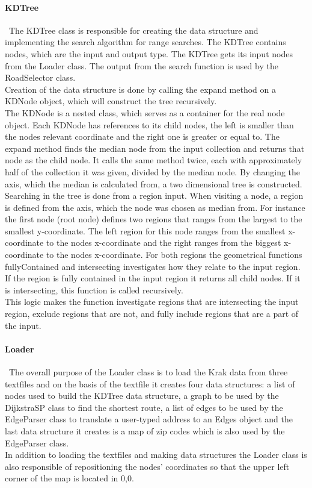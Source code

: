 \documentclass[a4paper,10pt,titlepage]{article}
\begin{document}
				\paragraph{KDTree}\mbox{}\
				The KDTree class is responsible for creating the data structure and implementing the search algorithm for range searches. The KDTree contains nodes, which are the input and output type. The KDTree gets its input nodes from the Loader class. The output from the search function is used by the RoadSelector class.\\
Creation of the data structure is done by calling the expand method on a KDNode object, which will construct the tree recursively.\\The KDNode is a nested class, which serves as a container for the real node object. Each KDNode has references to its child nodes, the left is smaller than the nodes relevant coordinate and the right one is greater or equal to. The expand method finds the median node from the input collection and returns that node as the child node. It calls the same method twice, each with approximately half of the collection it was given, divided by the median node. By changing the axis, which the median is calculated from, a two dimensional tree is constructed.\\
Searching in the tree is done from a region input. When visiting a node, a region is defined from the axis, which the node was chosen as median from. For instance the first node (root node) defines two regions that ranges from the largest to the smallest y-coordinate. The left region for this node ranges from the smallest x-coordinate to the nodes x-coordinate and the right ranges from the biggest x-coordinate to the nodes x-coordinate. For both regions the geometrical functions fullyContained and intersecting investigates how they relate to the input region. If the region is fully contained in the input region it returns all child nodes. If it is intersecting, this function is called recursively.\\This logic makes the function investigate regions that are intersecting the input region, exclude regions that are not, and fully include regions that are a part of the input.

				
				\paragraph{Loader}\mbox{}\
The overall purpose of the Loader class is to load the Krak data from three textfiles and on the basis of the textfile it creates four data structures: a list of nodes used to build the KDTree data structure, a graph to be used by the DijkstraSP class to find the shortest route, a list of edges to be used by the EdgeParser class to translate a user-typed address to an Edges object and the last data structure it creates is a map of zip codes which is also used by the EdgeParser class.\\
In addition to loading the textfiles and making data structures the Loader class is also responsible of repositioning the nodes' coordinates so that the upper left corner of the map is located in 0,0.
\end{document}
